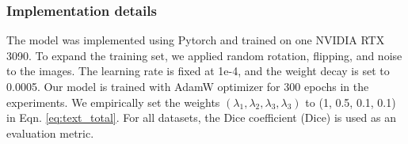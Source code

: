 \documentclass[sigconf,natbib=false]{acmart}
\begin{document}
\subsubsection{Implementation details}
The model was implemented using Pytorch and trained on one NVIDIA RTX 3090. To expand the training set, we applied random rotation, flipping, and noise to the images. The learning rate is fixed at 1e-4, and the weight decay is set to 0.0005. Our model is trained with AdamW optimizer for 300 epochs in the experiments. We empirically set the weights $(\lambda_1, \lambda_2, \lambda_3, \lambda_3)$ to (1, 0.5, 0.1, 0.1) in Eqn. \ref{eq:text_total}. For all datasets, the Dice coefficient (Dice) is used as an evaluation metric.
\vspace{-2mm}
\begin{table}[!ht]\footnotesize
\setlength{\abovecaptionskip}{0mm}
  \caption{Performance comparison between our method (ScribbleVC) and other state-of-the-art methods on ACDC. Bold denotes the best performance.}
\end{table}
\end{document}
